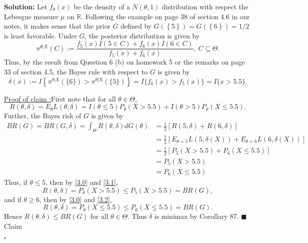 \documentclass[12pt]{article}
\newcounter{ProofCounter}
\newcounter{ClaimCounter}[ProofCounter]
\newenvironment{Solution}{\stepcounter{ProofCounter}\textbf{Solution:}}{\hfill$\square$}
\newenvironment{claim}[1]{\vspace{1mm}\stepcounter{ClaimCounter}\par\noindent\underline{\bf Claim \theClaimCounter:}\space#1}{}
\newenvironment{claimproof}[1]{\par\noindent\underline{Proof of claim \theClaimCounter:}\space#1}{\hfill $\blacksquare$ Claim \theClaimCounter}
\begin{document}
\begin{Solution}
  Let $f_{\theta}(x)$ be the density of a $N(\theta, 1)$ distribution with respect the Lebesgue measure $\mu$ on $\mathbb{R}$.
  Following the example on page 38 of section 4.6 in our notes, it makes sense that the prior $G$ defined by $G(\left\{ 5 \right\}) = G(\left\{ 6
  \right\}) = 1/2$ is least favorable. Under $G$, the posterior distribution is given by 
  \[
    \pi^{\theta | X}(C) := \frac{f_{5}(x)I(5\in C) + f_{6}(x)I(6\in C)}{f_{5}(x) + f_{6}(x)}, \ C \subseteq \Theta.
  \]
  Thus, by the result from Question 6 (b) on homework 5 or the remarks on page 33 of section 4.5, the Bayes rule with respect to $G$ is given by 
  \[
    \delta(x) := I\left\{ \pi^{\theta|X}(\{6\}) > \pi^{\theta |X}(\{5\}) \right\} = I\{f_{6}(x) > f_{5}(x)\} = I\{x > 5.5\}.
  \]
  \begin{claimproof}
    First note that for all $\theta \in \Theta$,
    \begin{equation}
      R(\theta, \delta) = E_{\theta}L(\theta, \delta) = I(\theta \leq 5)P_{\theta}(X > 5.5) + I(\theta > 5)P_{\theta}(X \leq 5.5).
      \label{3.0}
    \end{equation}
    Further, the Bayes risk of $G$ is given by 
    \begin{align}
      BR(G) = BR(G, \delta) = \int_{\Theta}R(\theta, \delta)dG(\theta) & = \frac{1}{2}\left[ R(5, \delta) + R(6,\delta)  \right] \nonumber \\
      & = \frac{1}{2}\left[ E_{\theta=5}L(5, \delta(X)) + E_{\theta=6}L(6,\delta(X)) \right] \nonumber\\
      & = \frac{1}{2}\left[ P_{5}(X > 5.5) + P_{6}(X \leq 5.5) \right]\nonumber \\
      & = P_{5}(X > 5.5) \label{3.1} \\
      & = P_{6}(X \leq 5.5) \label{3.2}
    \end{align}
    Thus, if $\theta \leq 5$, then by \eqref{3.0} and \eqref{3.1}, 
    \[
      R(\theta, \delta) = P_{\theta}(X > 5.5) \leq P_{5}(X > 5.5) = BR(G),
    \]
    and if $\theta \geq 6$, then by \eqref{3.0} and \eqref{3.2},
    \[
      R(\theta, \delta) = P_{\theta}(X \leq 5.5) \leq P_{6}(X \leq 5.5) = BR(G).
    \]
    Hence $R(\theta, \delta) \leq BR(G)$ for all $\theta \in \Theta$. Thus $\delta$ is minimax by Corollary 87.
  \end{claimproof}

\end{Solution}
\end{document}
